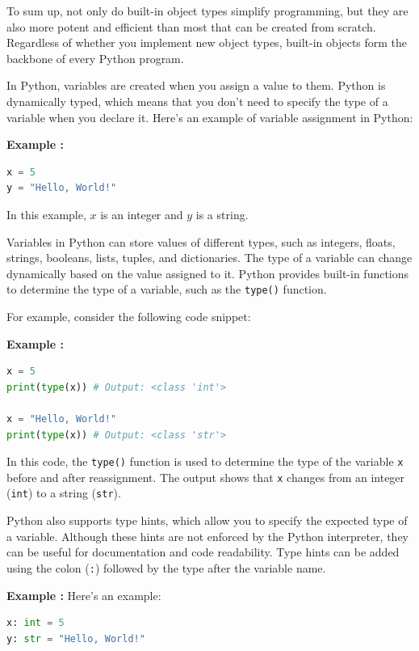 \documentclass[12pt]{book}
\newtheorem{Example}{Example}[chapter]
\renewenvironment{Example}{\begin{trivlist}\item\relax
\textbf{Example \thesection: }}{\end{trivlist}}
\begin{document}
To sum up, not only do built-in object types simplify programming, but they are also more potent and efficient than most that can be created from scratch. Regardless of whether you implement new object types, built-in objects form the backbone of every Python program.

In Python, variables are created when you assign a value to them. Python is dynamically typed, which means that you don't need to specify the type of a variable when you declare it. Here's an example of variable assignment in Python:
\begin{Example}
\begin{lstlisting}[language=Python]
x = 5
y = "Hello, World!"
\end{lstlisting}
\end{Example}
In this example, $x$ is an integer and $y$ is a string.

Variables in Python can store values of different types, such as integers, floats, strings, booleans, lists, tuples, and dictionaries. The type of a variable can change dynamically based on the value assigned to it. Python provides built-in functions to determine the type of a variable, such as the \texttt{type()} function.

For example, consider the following code snippet:

\begin{Example}
\begin{lstlisting}[language=Python]
x = 5
print(type(x)) # Output: <class 'int'>

x = "Hello, World!"
print(type(x)) # Output: <class 'str'>
\end{lstlisting}
\end{Example}

In this code, the \texttt{type()} function is used to determine the type of the variable \texttt{x} before and after reassignment. The output shows that \texttt{x} changes from an integer (\texttt{int}) to a string (\texttt{str}).

Python also supports type hints, which allow you to specify the expected type of a variable. Although these hints are not enforced by the Python interpreter, they can be useful for documentation and code readability. Type hints can be added using the colon (\texttt{:}) followed by the type after the variable name.

\begin{Example}
Here's an example:

\begin{lstlisting}[language=Python]
x: int = 5
y: str = "Hello, World!"
\end{lstlisting}
\end{Example}
\end{document}
